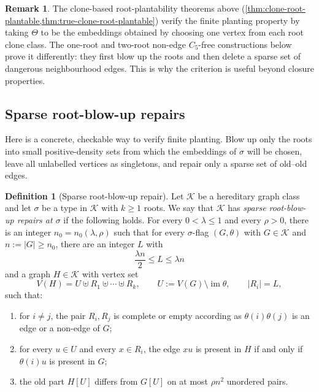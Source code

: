 \documentclass[11pt]{article}
\theoremstyle{definition}
\newtheorem{definition}[definition]{Definition}
\newtheorem{remark}[remark]{Remark}
\newcommand{\K}{\mathcal{K}}
\begin{document}
\begin{remark}
The clone-based root-plantability theorems above
(\cref{thm:clone-root-plantable,thm:true-clone-root-plantable}) verify the finite
planting property by taking $\Theta$ to be the embeddings obtained by choosing one vertex
from each root clone class.  The one-root and two-root non-edge $C_5$-free constructions
below prove it differently: they first blow up the roots and then delete a sparse set of
dangerous neighbourhood edges.  This is why the criterion is useful beyond closure
properties.
\end{remark}

\subsection{Sparse root-blow-up repairs}

Here is a concrete, checkable way to verify finite planting.  Blow up only
the roots into small positive-density sets from which the embeddings of
$\sigma$ will be chosen, leave all unlabelled vertices as singletons, and repair only a
sparse set of old--old edges.

\begin{definition}[Sparse root-blow-up repair]\label{def:sparse-root-repair}
Let $\K$ be a hereditary graph class and let $\sigma$ be a type in $\K$ with
$k\ge1$ roots.  We say that $\K$ has \emph{sparse root-blow-up
repairs at $\sigma$} if the following holds.
For every $0<\lambda\le1$ and every $\rho>0$, there is an integer
$n_0=n_0(\lambda,\rho)$ such that for every $\sigma$-flag $(G,\theta)$ with $G\in\K$
and $n:=|G|\ge n_0$, there are an integer $L$ with
\[
  \frac{\lambda n}{2}\le L\le \lambda n
\]
and a graph $H\in\K$ with vertex set
\[
  V(H)=U\uplus R_1\uplus\cdots\uplus R_k,
  \qquad
  U:=V(G)\setminus\operatorname{im}\theta,
  \qquad
  |R_i|=L,
\]
such that:
\begin{enumerate}[label=\textup{(\roman*)}, leftmargin=2.5em]
  \item for $i\ne j$, the pair $R_i,R_j$ is complete or empty according as
        $\theta(i)\theta(j)$ is an edge or a non-edge of $G$;
  \item for every $u\in U$ and every $x\in R_i$, the edge $xu$ is present in
        $H$ if and only if $\theta(i)u$ is present in $G$;
  \item the old part $H[U]$ differs from $G[U]$ on at most $\rho n^2$ unordered
        pairs.
\end{enumerate}
\end{definition}
\end{document}
